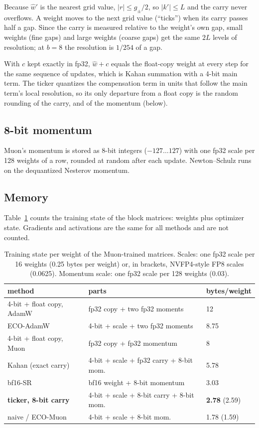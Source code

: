 \documentclass[11pt]{article}
\begin{document}
Because $\hat w'$ is the nearest grid value, $|r| \le g_\pm/2$, so $|k'| \le L$ and the carry never overflows. A
weight moves to the next grid value (``ticks'') when its carry passes half a gap. Since the carry is measured relative
to the weight's own gap, small weights (fine gaps) and large weights (coarse gaps) get the same $2L$ levels of
resolution; at $b=8$ the resolution is $1/254$ of a gap.

With $c$ kept exactly in fp32, $\hat w + c$ equals the float-copy weight at every step for the same sequence of
updates, which is Kahan summation \citep{kahan1965} with a 4-bit main term. The ticker quantizes the compensation term
in units that follow the main term's local resolution, so its only departure from a float copy is the random rounding
of the carry, and of the momentum (below).

\subsection{8-bit momentum}
Muon's momentum is stored as 8-bit integers ($-127\dots127$) with one fp32 scale per 128 weights of a row, rounded at
random after each update. Newton--Schulz runs on the dequantized Nesterov momentum.

\subsection{Memory}
Table~\ref{tab:bytes} counts the training state of the block matrices: weights plus optimizer state. Gradients and
activations are the same for all methods and are not counted.

\begin{table}[t]
\centering
\caption{Training state per weight of the Muon-trained matrices. Scales: one fp32 scale per 16 weights (0.25 bytes per
weight) or, in brackets, NVFP4-style FP8 scales (0.0625). Momentum scale: one fp32 scale per 128 weights (0.03).}
\label{tab:bytes}
\small
\begin{tabular}{lll}
\toprule
method & parts & bytes/weight \\
\midrule
4-bit + float copy, AdamW & fp32 copy + two fp32 moments & 12 \\
ECO-AdamW & 4-bit + scale + two fp32 moments & 8.75 \\
4-bit + float copy, Muon & fp32 copy + fp32 momentum & 8 \\
Kahan (exact carry) & 4-bit + scale + fp32 carry + 8-bit mom. & 5.78 \\
bf16-SR & bf16 weight + 8-bit momentum & 3.03 \\
\textbf{ticker, 8-bit carry} & 4-bit + scale + 8-bit carry + 8-bit mom. & \textbf{2.78} (2.59) \\
naive / ECO-Muon & 4-bit + scale + 8-bit mom. & 1.78 (1.59) \\
\bottomrule
\end{tabular}
\end{table}
\end{document}
